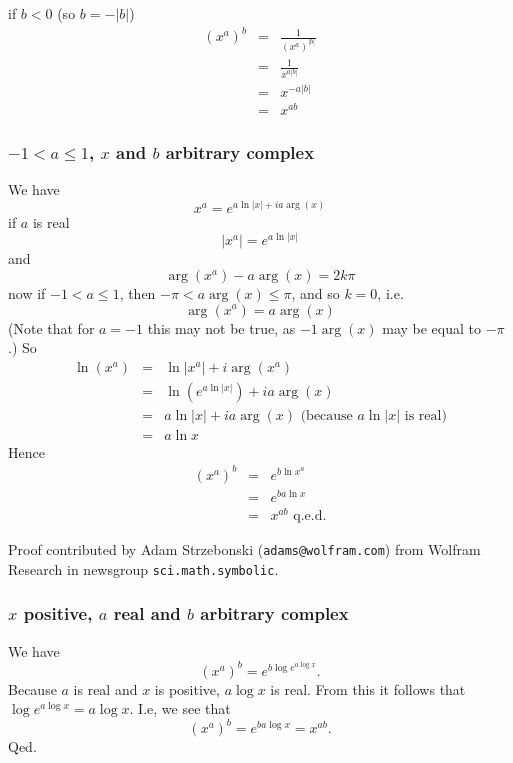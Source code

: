 \documentclass{article}
\begin{document}
if \(b<0\) (so \(b=-|b|\))
\begin{eqnarray}
(x^a)^b & = & \frac{1}{(x^a)^{|b|}}
\nonumber\\
& = & \frac{1}{x^{a|b|}}
\nonumber\\
& = & x^{-a|b|}
\nonumber\\
& = & x^{ab}
\end{eqnarray}

\subsubsection{\(-1 < a \le 1\), \(x\) and \(b\) arbitrary complex}

We have
\begin{equation}
x^a=e^{a \ln|x| + ia\arg(x)}
\end{equation}
if \(a\) is real
\begin{equation}
|x^a|=e^{a\ln|x|}
\end{equation}
and
\begin{equation}
\arg(x^a)-a\arg(x)=2k\pi
\end{equation}
now if \(-1 < a \le 1\), then \(-\pi < a\arg(x) \le \pi\),
and so \(k=0\), i.e.
\begin{equation}
\arg(x^a)=a\arg(x)
\end{equation}
(Note that for \(a=-1\) this may not be true, as \(-1 \arg(x)\) may be equal to \(-\pi\).)
So
\begin{eqnarray}
\ln(x^a) & = & \ln|x^a| + i\arg(x^a)
\nonumber\\
& = & \ln (e^{a\ln|x|})+ia\arg(x)
\nonumber\\
& = & a \ln |x| + ia\arg(x) \mbox{ (because \(a\ln|x|\) is real)}
\nonumber\\
& = & a\ln x
\end{eqnarray}
Hence
\begin{eqnarray}
(x^a)^b & = & e^{b\ln x^a}
\nonumber\\
& = & e^{ba\ln x}
\nonumber\\
& = & x^{ab} \mbox{ q.e.d.}
\end{eqnarray}

Proof contributed by Adam Strzebonski ({\tt adams@wolfram.com}) from
Wolfram Research in newsgroup {\tt sci.math.symbolic}.

\subsubsection{$x$ positive, $a$ real and $b$ arbitrary complex}
We have
\begin{equation}
(x^a)^b = e^{b\log e^{a\log x}}.
\end{equation}
Because $a$ is real and $x$ is positive, $a\log x$ is real. From this
it follows that $\log e^{a\log x} = a\log x$. I.e, we see that
\begin{equation}
(x^a)^b = e^{ba\log x} = x^{ab}.
\end{equation}
Qed.
\end{document}
